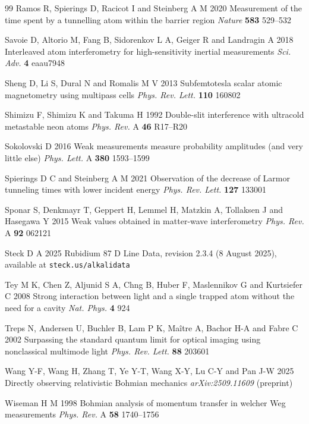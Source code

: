 \documentclass[11pt,a4paper]{article}
\begin{document}
\begin{thebibliography}{99}
Ramos R, Spierings D, Racicot I and Steinberg A M 2020 Measurement of the time spent by a tunnelling atom within the barrier region \textit{Nature} \textbf{583} 529--532

Savoie D, Altorio M, Fang B, Sidorenkov L A, Geiger R and Landragin A 2018 Interleaved atom interferometry for high-sensitivity inertial measurements \textit{Sci. Adv.} \textbf{4} eaau7948

Sheng D, Li S, Dural N and Romalis M V 2013 Subfemtotesla scalar atomic magnetometry using multipass cells \textit{Phys. Rev. Lett.} \textbf{110} 160802

Shimizu F, Shimizu K and Takuma H 1992 Double-slit interference with ultracold metastable neon atoms \textit{Phys. Rev.} A \textbf{46} R17--R20

Sokolovski D 2016 Weak measurements measure probability amplitudes (and very little else) \textit{Phys. Lett.} A \textbf{380} 1593--1599

Spierings D C and Steinberg A M 2021 Observation of the decrease of Larmor tunneling times with lower incident energy \textit{Phys. Rev. Lett.} \textbf{127} 133001

Sponar S, Denkmayr T, Geppert H, Lemmel H, Matzkin A, Tollaksen J and Hasegawa Y 2015 Weak values obtained in matter-wave interferometry \textit{Phys. Rev.} A \textbf{92} 062121

Steck D A 2025 Rubidium 87 D Line Data, revision 2.3.4 (8 August 2025), available at \texttt{steck.us/alkalidata}

Tey M K, Chen Z, Aljunid S A, Chng B, Huber F, Maslennikov G and Kurtsiefer C 2008 Strong interaction between light and a single trapped atom without the need for a cavity \textit{Nat. Phys.} \textbf{4} 924

Treps N, Andersen U, Buchler B, Lam P K, Ma\^itre A, Bachor H-A and Fabre C 2002 Surpassing the standard quantum limit for optical imaging using nonclassical multimode light \textit{Phys. Rev. Lett.} \textbf{88} 203601

Wang Y-F, Wang H, Zhang T, Ye Y-T, Wang X-Y, Lu C-Y and Pan J-W 2025 Directly observing relativistic Bohmian mechanics \textit{arXiv:2509.11609} (preprint)

Wiseman H M 1998 Bohmian analysis of momentum transfer in welcher Weg measurements \textit{Phys. Rev.} A \textbf{58} 1740--1756


\end{thebibliography}
\end{document}
